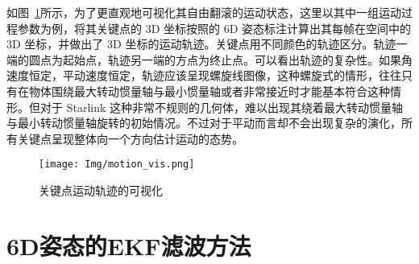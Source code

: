 如图~\ref{fig:motion_vis}所示，为了更直观地可视化其自由翻滚的运动状态，这里以其中一组运动过程参数为例，将其关键点的 3D 坐标按照的 6D 姿态标注计算出其每帧在空间中的 3D 坐标，并做出了 3D 坐标的运动轨迹。关键点用不同颜色的轨迹区分。轨迹一端的圆点为起始点，轨迹另一端的方点为终止点。可以看出轨迹的复杂性。如果角速度恒定，平动速度恒定，轨迹应该呈现螺旋线图像，这种螺旋式的情形，往往只有在物体围绕最大转动惯量轴与最小惯量轴或者非常接近时才能基本符合这种情形。但对于 Starlink 这种非常不规则的几何体，难以出现其绕着最大转动惯量轴与最小转动惯量轴旋转的初始情况。不过对于平动而言却不会出现复杂的演化，所有关键点呈现整体向一个方向估计运动的态势。
\begin{figure}[htbp]
	\centering
	\texttt{[image: Img/motion\_vis.png]}
	\caption{关键点运动轨迹的可视化}
	\label{fig:motion_vis}
\end{figure}

\section{6D姿态的EKF滤波方法}
\label{sec:EKF_filter}

